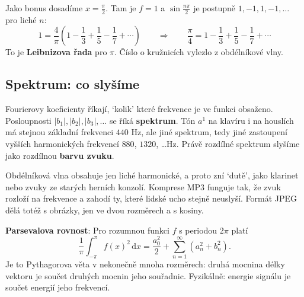 Jako bonus dosadíme $x = \frac{\pi}{2}$. Tam je $f = 1$ a $\sin\frac{n\pi}{2}$ je postupně $1, -1, 1, -1, \dots$ pro liché $n$:
\begin{equation*}
  1 = \frac{4}{\pi}\left(1 - \frac{1}{3} + \frac{1}{5} - \frac{1}{7} + \cdots\right)\qquad\Longrightarrow\qquad\frac{\pi}{4} = 1 - \frac{1}{3} + \frac{1}{5} - \frac{1}{7} + \cdots
\end{equation*}
To je \textbf{Leibnizova řada} pro $\pi$. Číslo o kružnicích vylezlo z obdélníkové vlny.

\subsection{Spektrum: co slyšíme}

Fourierovy koeficienty říkají, `kolik' které frekvence je ve funkci obsaženo. Posloupnosti $|b_1|, |b_2|, |b_3|, \dots$ se říká \textbf{spektrum}. Tón $a^1$ na klavíru i na houslích má stejnou základní frekvenci $440$ Hz, ale jiné spektrum, tedy jiné zastoupení vyšších harmonických frekvencí $880$, $1320$, \dots Hz. Právě rozdílné spektrum slyšíme jako rozdílnou \textbf{barvu zvuku}.

\begin{center}
\end{center}

Obdélníková vlna obsahuje jen liché harmonické, a proto zní `dutě', jako klarinet nebo zvuky ze starých herních konzolí. Komprese MP3 funguje tak, že zvuk rozloží na frekvence a zahodí ty, které lidské ucho stejně neuslyší. Formát JPEG dělá totéž s obrázky, jen ve dvou rozměrech a s kosiny.

\begin{definitionbox}
  \textbf{Parsevalova rovnost}: Pro rozumnou funkci $f$ s periodou $2\pi$ platí
  \begin{equation*}
    \frac{1}{\pi}\int_{-\pi}^{\pi}f(x)^2\,\mathrm{d}x = \frac{a_0^2}{2} + \sum_{n=1}^{\infty}\left(a_n^2 + b_n^2\right).
  \end{equation*}
  Je to Pythagorova věta v nekonečně mnoha rozměrech: druhá mocnina délky vektoru je součet druhých mocnin jeho souřadnic. Fyzikálně: energie signálu je součet energií jeho frekvencí.
\end{definitionbox}

